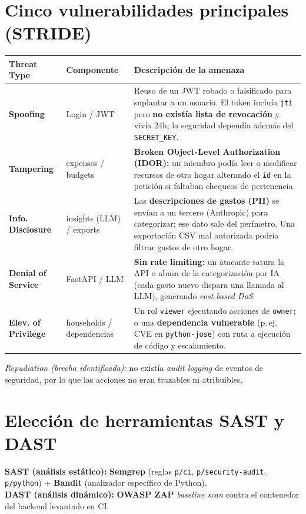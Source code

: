 \documentclass[11pt,a4paper]{article}
\begin{document}
\section{Cinco vulnerabilidades principales (STRIDE)}
\renewcommand{\arraystretch}{1.25}
\begin{tabularx}{\linewidth}{@{}l l Y@{}}
\toprule
\textbf{Threat Type} & \textbf{Componente} & \textbf{Descripción de la amenaza} \\
\midrule
\textcolor{crit}{\textbf{Spoofing}} & Login / JWT &
Reuso de un JWT robado o falsificado para suplantar a un usuario. El token incluía \texttt{jti} pero
\textbf{no existía lista de revocación} y vivía 24h; la seguridad dependía además del \texttt{SECRET\_KEY}. \\
\textcolor{crit}{\textbf{Tampering}} & expenses / budgets &
\textbf{Broken Object-Level Authorization (IDOR):} un miembro podía leer o modificar recursos de otro
hogar alterando el \texttt{id} en la petición si faltaban chequeos de pertenencia. \\
\textcolor{high}{\textbf{Info. Disclosure}} & insights (LLM) / exports &
Las \textbf{descripciones de gastos (PII)} se envían a un tercero (Anthropic) para categorizar; ese dato
sale del perímetro. Una exportación CSV mal autorizada podría filtrar gastos de otro hogar. \\
\textcolor{high}{\textbf{Denial of Service}} & FastAPI / LLM &
\textbf{Sin rate limiting:} un atacante satura la API o abusa de la categorización por IA (cada gasto
nuevo dispara una llamada al LLM), generando \emph{cost-based DoS}. \\
\textcolor{high}{\textbf{Elev. of Privilege}} & households / dependencias &
Un rol \texttt{viewer} ejecutando acciones de \texttt{owner}; o una \textbf{dependencia vulnerable}
(p.\,ej. CVE en \texttt{python-jose}) con ruta a ejecución de código y escalamiento. \\
\bottomrule
\end{tabularx}

\vspace{4pt}
\noindent\emph{Repudiation (brecha identificada):} no existía \emph{audit logging} de eventos de seguridad,
por lo que las acciones no eran trazables ni atribuibles.

\section{Elección de herramientas SAST y DAST}
\textbf{SAST (análisis estático):} \textbf{Semgrep} (reglas \texttt{p/ci}, \texttt{p/security-audit},
\texttt{p/python}) + \textbf{Bandit} (analizador específico de Python).\\
\textbf{DAST (análisis dinámico):} \textbf{OWASP ZAP} \emph{baseline scan} contra el contenedor del backend
levantado en CI.
\end{document}

